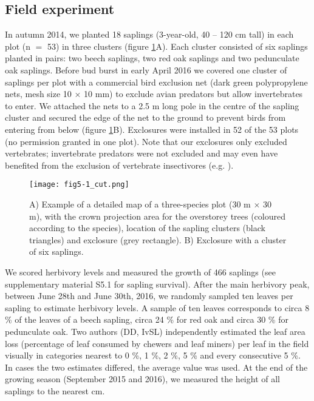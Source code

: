 \documentclass[10pt, twoside]{book} %
\begin{document}
		\subsection*{Field experiment}
		In autumn 2014, we planted 18 saplings (3-year-old, 40 -- 120 cm tall) in each plot (n $=$ 53) in three clusters (figure \ref{fig5-1}A). Each cluster consisted of six saplings planted in pairs: two beech saplings, two red oak saplings and two pedunculate oak saplings. Before bud burst in early April 2016 we covered one cluster of saplings per plot with a commercial bird exclusion net (dark green polypropylene nets, mesh size 10 $\times$ 10 mm) to exclude avian predators but allow invertebrates to enter. We attached the nets to a 2.5 m long pole in the centre of the sapling cluster and secured the edge of the net to the ground to prevent birds from entering from below (figure \ref{fig5-1}B). Exclosures were installed in 52 of the 53 plots (no permission granted in one plot). Note that our exclosures only excluded vertebrates; invertebrate predators were not excluded and may even have benefited from the exclusion of vertebrate insectivores (e.g. \citealt{Bosc2018, Grass2017}).\\
				
\begin{figure}[h!]
	\begin{center}
		\texttt{[image: fig5-1\_cut.png]}
	\end{center}
	\caption{A) Example of a detailed map of a three-species plot (30 m $\times$ 30 m), with the crown projection area for the overstorey trees (coloured according to the species), location of the sapling clusters (black triangles) and exclosure (grey rectangle). B) Exclosure with a cluster of six saplings. \label{fig5-1}}
\end{figure}
		
		We scored herbivory levels and measured the growth of 466 saplings (see supplementary material S5.1 for sapling survival). After the main herbivory peak, between June 28th and June 30th, 2016, we randomly sampled ten leaves per sapling to estimate herbivory levels. A sample of ten leaves corresponds to circa 8 \% of the leaves of a beech sapling, circa 24 \% for red oak and circa 30 \% for pedunculate oak. Two authors (DD, IvSL) independently estimated the leaf area loss (percentage of leaf consumed by chewers and leaf miners) per leaf in the field visually in categories nearest to 0 \%, 1 \%, 2 \%, 5 \% and every consecutive 5 \%. In cases the two estimates differed, the average value was used. At the end of the growing season (September 2015 and 2016), we measured the height of all saplings to the nearest cm.\\
		
\end{document}
